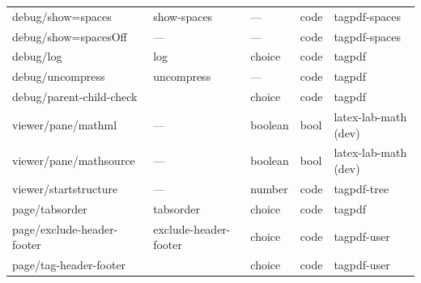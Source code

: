 \begin{longtable}{lllll}
debug/show=spaces & show-spaces    &    ---           &code  & tagpdf-spaces\\
debug/show=spacesOff& ---          &    ---           &code  & tagpdf-spaces\\
debug/log        & log             & choice           &code  & tagpdf \\
debug/uncompress & uncompress      &  ---             &code  & tagpdf\\
debug/parent-child-check &         & choice           &code  &tagpdf   
\\[4pt]\midrule  
viewer/pane/mathml &  ---          &  boolean         &bool  &latex-lab-math (dev)\\
viewer/pane/mathsource& ---        &boolean           &bool  &latex-lab-math (dev)\\
viewer/startstructure & ---        &number            &code  &tagpdf-tree \\[4pt]\midrule
page/tabsorder  &tabsorder         & choice          & code & tagpdf\\   
page/exclude-header-footer & exclude-header-footer &choice & code &tagpdf-user\\
page/tag-header-footer & &choice & code &tagpdf-user\\


\end{longtable}
